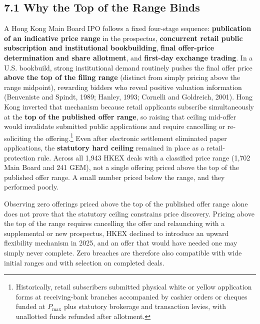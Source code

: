 \documentclass[11pt,letterpaper]{article}
\begin{document}
\subsection*{\texorpdfstring{7.1 Why the Top of the Range Binds}{7.1 Why the Top of the Range Binds}}
A Hong Kong Main Board IPO follows a fixed four-stage sequence: \textbf{publication of an indicative price range} in the prospectus, \textbf{concurrent retail public subscription and institutional bookbuilding}, \textbf{final offer-price determination and share allotment}, and \textbf{first-day exchange trading}. In a U.S. bookbuild, strong institutional demand routinely pushes the final offer price \textbf{above the top of the filing range} (distinct from simply pricing above the range midpoint), rewarding bidders who reveal positive valuation information (Benveniste and Spindt, 1989; Hanley, 1993; Cornelli and Goldreich, 2001). Hong Kong inverted that mechanism because retail applicants subscribe simultaneously at the \textbf{top of the published offer range}, so raising that ceiling mid-offer would invalidate submitted public applications and require cancelling or re-soliciting the offering.\footnote{Historically, retail subscribers submitted physical white or yellow application forms at receiving-bank branches accompanied by cashier orders or cheques funded at $P_{\max}$ plus statutory brokerage and transaction levies, with unallotted funds refunded after allotment.} Even after electronic settlement eliminated paper applications, the \textbf{statutory hard ceiling} remained in place as a retail-protection rule. Across all 1,943 HKEX deals with a classified price range (1,702 Main Board and 241 GEM), not a single offering priced above the top of the published offer range. A small number priced below the range, and they performed poorly.

Observing zero offerings priced above the top of the published offer range alone does not prove that the statutory ceiling constrains price discovery. Pricing above the top of the range requires cancelling the offer and relaunching with a supplemental or new prospectus, HKEX declined to introduce an upward flexibility mechanism in 2025, and an offer that would have needed one may simply never complete. Zero breaches are therefore also compatible with wide initial ranges and with selection on completed deals.
\end{document}
